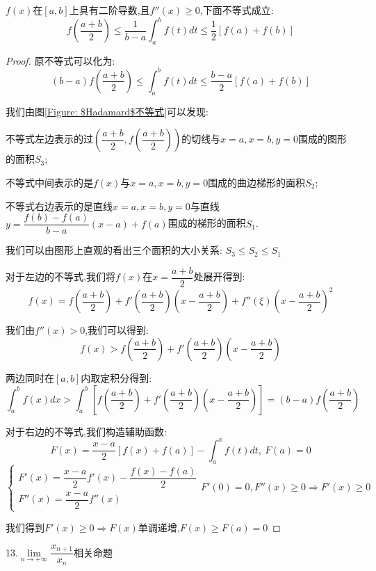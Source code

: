 \begin{theorem}\label{thm: $Hadamard$不等式}
	$f(x)$在$[a,b]$上具有二阶导数,且$f''(x)\geq 0$,下面不等式成立:  
	$$f(\dfrac{a+b}{2})\leq \dfrac{1}{b-a}\int_{a}^{b}f(t)dt\leq \dfrac{1}{2}[f(a)+f(b)]$$
	\begin{proof}
		
		原不等式可以化为:  
		$$(b-a)f(\dfrac{a+b}{2})\leq\int_{a}^{b}f(t)dt\leq\dfrac{b-a}{2}[f(a)+f(b)]$$
		
		我们由图\ref{Figure: $Hadamard$不等式}可以发现:  
		
		不等式左边表示的过$(\dfrac{a+b}{2},f(\dfrac{a+b}{2}))$的切线与$x=a,x=b,y=0$围成的图形的面积$S_{3}$;
		
		不等式中间表示的是$f(x)$与$x=a,x=b,y=0$围成的曲边梯形的面积$S_{2}$;
		
		不等式右边表示的是直线$x=a,x=b,y=0$与直线$y=\dfrac{f(b)-f(a)}{b-a}(x-a)+f(a)$围成的梯形的面积$S_{1}$.
		
		我们可以由图形上直观的看出三个面积的大小关系:  $S_{3}\leq S_{2}\leq S_{1}$
		
		对于左边的不等式,我们将$f(x)$在$x=\dfrac{a+b}{2}$处展开得到:  
		$$f(x)=f(\dfrac{a+b}{2})+f'(\dfrac{a+b}{2})(x-\dfrac{a+b}{2})+f''(\xi)(x-\dfrac{a+b}{2})^2$$
		
		我们由$f''(x)>0$,我们可以得到:  
		$$f(x)>f(\dfrac{a+b}{2})+f'(\dfrac{a+b}{2})(x-\dfrac{a+b}{2})$$
		
		两边同时在$[a,b]$内取定积分得到:  
		$$\int_{a}^{b}f(x)dx>\int_{a}^{b}[f(\dfrac{a+b}{2})+f'(\dfrac{a+b}{2})(x-\dfrac{a+b}{2})]=(b-a)f(\dfrac{a+b}{2})$$
		
		对于右边的不等式,我们构造辅助函数:  
		$$F(x)=\dfrac{x-a}{2}[f(x)+f(a)]-\int_{a}^{x}f(t)dt,\ F(a)=0$$
		$$\left\lbrace
		\begin{array}{l}
			F'(x)=\dfrac{x-a}{2}f'(x)-\dfrac{f(x)-f(a)}{2}\\
			F''(x)=\dfrac{x-a}{2}f''(x)
		\end{array}
		\right. F'(0)=0,F''(x)\geq 0\Rightarrow F'(x)\geq 0$$
		
		我们得到$F'(x)\geq 0\Rightarrow F(x)\text{单调递增}$,$F(x)\geq F(a)=0$
	\end{proof}
\end{theorem}
13.$\lim\limits_{n\rightarrow +\infty}\dfrac{x_{n+1}}{x_{n}}\text{相关命题}$
